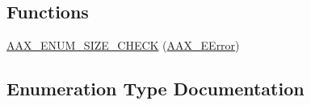 \subsection*{Functions}
\begin{DoxyCompactItemize}
\item 
\hyperlink{a00207_aaba9e3f1468463f7ead56dfdf2cfa773}{A\+A\+X\+\_\+\+E\+N\+U\+M\+\_\+\+S\+I\+Z\+E\+\_\+\+C\+H\+E\+C\+K} (\hyperlink{a00207_a5f8c7439f3a706c4f8315a9609811937}{A\+A\+X\+\_\+\+E\+Error})
\end{DoxyCompactItemize}


\subsection{Enumeration Type Documentation}
\hypertarget{a00207_a5f8c7439f3a706c4f8315a9609811937}{}
